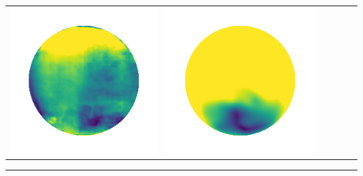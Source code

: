 \begin{tabularx}{\linewidth}{@{}Y@{}Y@{}Y@{}Y@{}Y@{}Y@{}}
\includegraphics[width=\linewidth]{semisynthetic/20150514_13_marrnet_err.png} &
\includegraphics[width=\linewidth]{semisynthetic/20150514_13_ef_err.png} \\
\end{tabularx}
\begin{center}\rule{0.5\linewidth}{\linethickness}\end{center}

